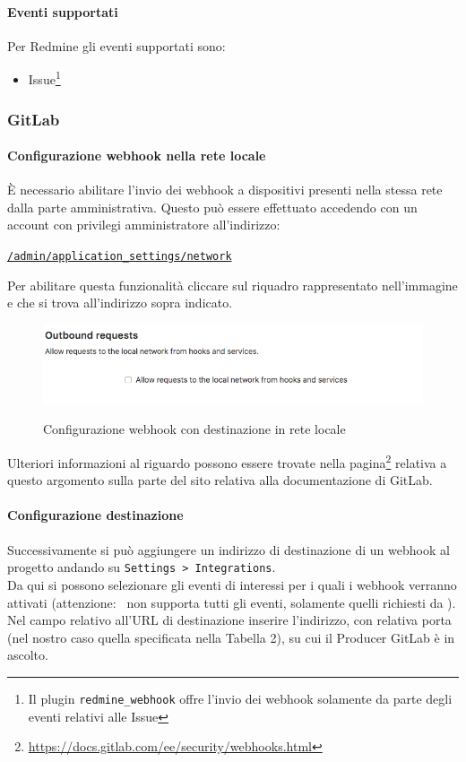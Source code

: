 		\paragraph{Eventi supportati}
		Per Redmine gli eventi supportati sono:
		\begin{itemize}
			\item Issue\footnote{Il plugin \texttt{redmine\_webhook} offre l'invio dei webhook solamente da parte degli eventi relativi alle Issue}
		\end{itemize}

	\subsubsection{GitLab}


		\paragraph{Configurazione webhook nella rete locale}
		È necessario abilitare l'invio dei webhook a dispositivi presenti nella stessa rete dalla parte amministrativa.
		Questo può essere effettuato accedendo con un account con privilegi amministratore all'indirizzo:
		\begin{center}
			\texttt{\url{/admin/application_settings/network}}
		\end{center}
		Per abilitare questa funzionalità cliccare sul riquadro rappresentato nell'immagine e che si trova all'indirizzo sopra indicato.
		\begin{figure}[H]
			\centering
			\includegraphics[width=13cm]{img/webhook_gitlab_setup.png}\\
			\caption[Webhook, GitLab]{Configurazione webhook con destinazione in rete locale}
		\end{figure}
		Ulteriori informazioni al riguardo possono essere trovate nella pagina\footnote{\url{https://docs.gitlab.com/ee/security/webhooks.html}} relativa a questo argomento sulla parte del sito relativa alla documentazione di GitLab.


		\paragraph{Configurazione destinazione}
		Successivamente si può aggiungere un indirizzo di destinazione di un webhook al progetto andando su \texttt{Settings > Integrations}.\\
		Da qui si possono selezionare gli eventi di interessi per i quali i webhook verranno attivati (attenzione: \progetto~non supporta tutti gli eventi, solamente quelli richiesti da \II).\\
		Nel campo relativo all'URL di destinazione inserire l'indirizzo, con relativa porta (nel nostro caso quella specificata nella Tabella 2), su cui il Producer GitLab è in ascolto.

